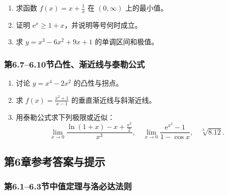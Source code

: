 \documentclass[fontset=fandol]{ctexart}
\newcommand{\ee}{\mathrm{e}}
\begin{document}
\begin{enumerate}[label=\textbf{练习\arabic*.},leftmargin=2.2em]
\item 求函数 $f(x)=x+\frac1x$ 在 $(0,\infty)$ 上的最小值。
\item 证明 $\ee^x\geq1+x$，并说明等号何时成立。
\item 求 $y=x^3-6x^2+9x+1$ 的单调区间和极值。
\end{enumerate}

\subsubsection*{第6.7--6.10节\quad 凸性、渐近线与泰勒公式}

\begin{enumerate}[label=\textbf{练习\arabic*.},leftmargin=2.2em]
\item 讨论 $y=x^4-2x^2$ 的凸性与拐点。
\item 求 $f(x)=\frac{x^2+1}{x-1}$ 的垂直渐近线与斜渐近线。
\item 用泰勒公式求下列极限或近似：
\[
\lim_{x\to0}\frac{\ln(1+x)-x+\frac{x^2}{2}}{x^3},\quad
\lim_{x\to0}\frac{\ee^{x^2}-1}{1-\cos x},\quad
\sqrt[3]{8.12}.
\]
\end{enumerate}

\subsection*{第6章参考答案与提示}

\subsubsection*{第6.1--6.3节\quad 中值定理与洛必达法则}
\end{document}
